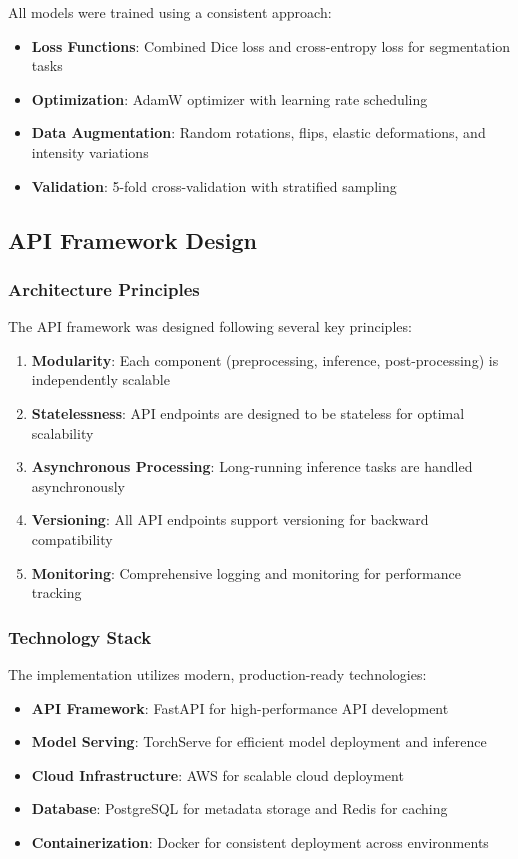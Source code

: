 \documentclass[12pt,a4paper]{article}
\begin{document}
All models were trained using a consistent approach:

\begin{itemize}
    \item \textbf{Loss Functions}: Combined Dice loss and cross-entropy loss for segmentation tasks
    \item \textbf{Optimization}: AdamW optimizer with learning rate scheduling
    \item \textbf{Data Augmentation}: Random rotations, flips, elastic deformations, and intensity variations
    \item \textbf{Validation}: 5-fold cross-validation with stratified sampling
\end{itemize}

\subsection{API Framework Design}

\subsubsection{Architecture Principles}

The API framework was designed following several key principles:

\begin{enumerate}
    \item \textbf{Modularity}: Each component (preprocessing, inference, post-processing) is independently scalable
    \item \textbf{Statelessness}: API endpoints are designed to be stateless for optimal scalability
    \item \textbf{Asynchronous Processing}: Long-running inference tasks are handled asynchronously
    \item \textbf{Versioning}: All API endpoints support versioning for backward compatibility
    \item \textbf{Monitoring}: Comprehensive logging and monitoring for performance tracking
\end{enumerate}

\subsubsection{Technology Stack}

The implementation utilizes modern, production-ready technologies:

\begin{itemize}
    \item \textbf{API Framework}: FastAPI for high-performance API development
    \item \textbf{Model Serving}: TorchServe for efficient model deployment and inference
    \item \textbf{Cloud Infrastructure}: AWS for scalable cloud deployment
    \item \textbf{Database}: PostgreSQL for metadata storage and Redis for caching
    \item \textbf{Containerization}: Docker for consistent deployment across environments
\end{itemize}
\end{document}
